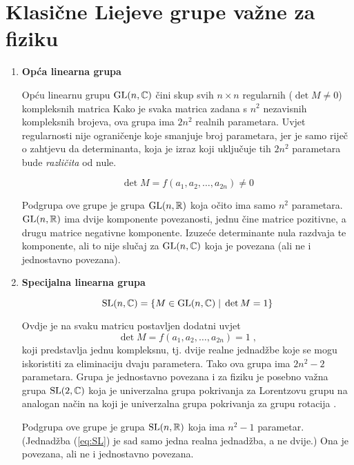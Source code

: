 \section{Klasične Liejeve grupe važne za fiziku}
\label{sec:primjeriLie}

\begin{enumerate}[leftmargin=0pt, itemindent=0pt]

\item \textbf{Opća linearna grupa}

Opću linearnu grupu $\mathrm{GL}(n, \mathbb{C})$ čini
skup svih $n\times n$ regularnih ($\det M \neq 0$)
kompleksnih matrica
Kako je svaka matrica zadana s $n^2$ nezavisnih kompleksnih brojeva, ova
grupa ima $2 n^2$ realnih parametara. Uvjet regularnosti nije ograničenje
koje smanjuje broj parametara, jer je samo riječ o zahtjevu da determinanta,
koja je izraz koji uključuje tih $2 n^2$ parametara bude \emph{različita} od nule.

\begin{equation}
\det M = f(a_1, a_2 , \dots, a_{2n}) \neq 0
\end{equation}

Podgrupa ove grupe je grupa $\mathrm{GL}(n, \mathbb{R})$ koja očito ima samo
$n^2$ parametara. $\mathrm{GL}(n, \mathbb{R})$ ima dvije komponente povezanosti,
jednu čine matrice pozitivne, a drugu matrice negativne komponente.
Izuzeće determinante nula razdvaja te komponente, ali to nije slučaj
za $\mathrm{GL}(n, \mathbb{C})$ koja je povezana (ali ne i jednostavno povezana).

\item \textbf{Specijalna linearna grupa}

\begin{equation}
\mathrm{SL}(n, \mathbb{C}) = \{ M\in \mathrm{GL}(n,\mathbb{C}) \; | \; \det M = 1\}
\end{equation}

Ovdje je na svaku matricu postavljen dodatni uvjet
\begin{equation}
\det M = f(a_1, a_2 , \dots, a_{2n}) = 1 \;,
\label{eq:SL}
\end{equation}
koji predstavlja jednu kompleksnu, tj. dvije realne jednadžbe koje
se mogu iskoristiti za eliminaciju dvaju parametera. Tako ova grupa
ima $2 n^2 - 2$ parametara. Grupa je jednostavno povezana i za fiziku
je posebno važna grupa $\mathrm{SL}(2, \mathbb{C})$ koja je univerzalna grupa
pokrivanja za Lorentzovu grupu na analogan način na koji je 
univerzalna grupa pokrivanja za grupu rotacija .

Podgrupa ove grupe je grupa $\mathrm{SL}(n, \mathbb{R})$ koja ima 
$n^2 - 1$ parametar. (Jednadžba (\ref{eq:SL}) je sad samo jedna
realna jednadžba, a ne dvije.) Ona je povezana, ali ne i jednostavno
povezana.


\end{enumerate}

